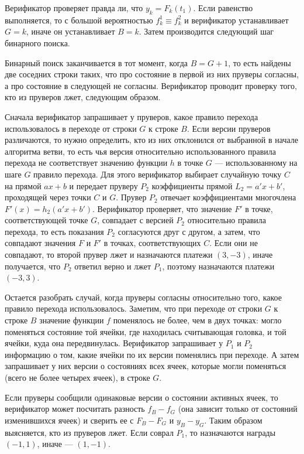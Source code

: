 \documentclass[14pt, a4paper]{extreport}
\begin{document}
        Верификатор проверяет правда ли, что $y_k = F_k(t_1)$. Если равенство выполняется, то с большой вероятностью $f^1_k \equiv f^2_k$ и верификатор устанавливает $G = k$, иначе он устанавливает $B = k$. Затем производится следующий шаг бинарного поиска.

        Бинарный поиск заканчивается в тот момент, когда $B = G + 1$, то есть найдены две соседних строки таких, что про состояние в первой из них пруверы согласны, а про состояние в следующей не согласны. Верификатор проводит проверку того, кто из пруверов лжет, следующим образом. 

        Сначала верификатор запрашивает у пруверов, какое правило перехода использовалось в переходе от строки $G$ к строке $B$. Если версии пруверов различаются, то нужно определить,
        кто из них отклонился от выбранной в начале алгоритма ветви, то есть чья версия относительно использованного правила перехода не соответствует значению функции $h$ в точке $G$ --- использованному на шаге $G$ правило перехода. Для этого верификатор выбирает случайную точку $C$ на прямой $a x + b$ и передает пруверу  $P_2$ коэффициенты прямой $L_2 = a'x + b'$, проходящей через точки $C$ и $G$. Прувер $P_2$ отвечает коэффициентами многочлена $F'(x) = h_2(a'x + b')$. Верификатор проверяет, что значение $F'$ в точке, соответствующей точке $G$, совпадает с версией $P_2$ относительно правила перехода, то есть показания $P_2$ согласуются друг с другом, а затем, что совпадают значения $F$ и $F'$ в точках, соответствующих $C$. Если они не совпадают, то второй прувер лжет и назначаются платежи $(3, -3)$, иначе получается, что $P_2$ ответил верно и лжет $P_1$, поэтому назначаются платежи $(-3, 3)$.

        Остается разобрать случай, когда пруверы согласны относительно того, какое правило перехода использовалось. Заметим, что при переходе от строки $G$ к строке $B$ значение функции $f$ поменялось не более, чем в двух точках: могло поменяться состояние той ячейки, где находилась считывающая головка, и той ячейки, куда она передвинулась. Верификатор запрашивает у $P_1$ и $P_2$ информацию о том, какие ячейки по их версии поменялись при переходе. А затем запрашивает у них версии о состояниях всех ячеек, которые могли поменяться (всего не более четырех ячеек), в строке $G$.

        Если пруверы сообщили одинаковые версии о состоянии активных ячеек, то верификатор может посчитать разность $f_B - f_G$ (она зависит только от состояний изменившихся ячеек) и сверить ее с $F_B - F_G$ и $y_B - y_G$. Таким образом выясняется, кто из пруверов лжет. Если соврал $P_1$, то назначаются награды $(-1, 1)$, иначе --- $(1, -1)$.
\end{document}
